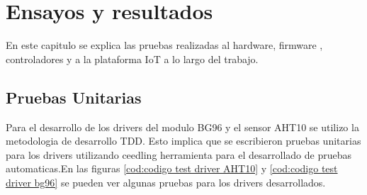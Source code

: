
\chapter{Ensayos y resultados} %
En este capitulo se explica las pruebas realizadas al hardware, firmware , controladores y a la plataforma IoT a lo largo del trabajo.
\label{Chapter4} %


\section{Pruebas Unitarias}
Para el desarrollo de los drivers del modulo BG96 y el sensor AHT10 se utilizo la metodologia de desarrollo TDD. Esto implica que se escribieron pruebas unitarias para los drivers utilizando ceedling herramienta para el desarrollado de pruebas automaticas.En las figuras \ref{cod:codigo test driver AHT10} y \ref{cod:codigo test driver bg96} se pueden ver algunas pruebas para los drivers desarrollados.
